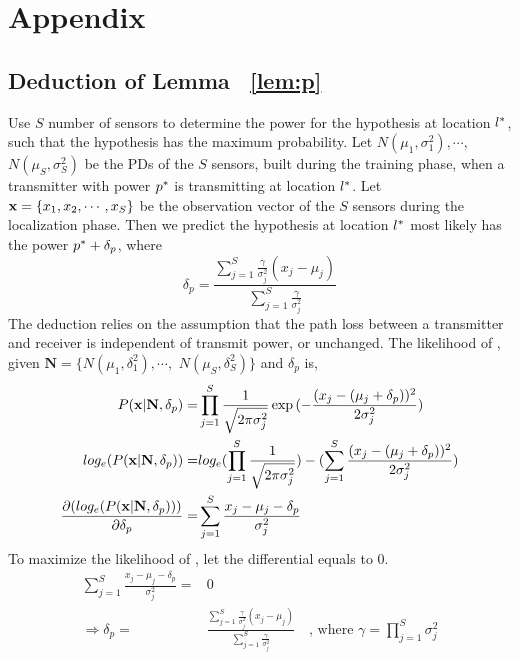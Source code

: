 \section*{Appendix}
\subsection*{Deduction of Lemma ~\ref{lem:p}}
Use $S$ number of sensors to determine the power for the hypothesis at location $l^*$, such that the hypothesis has the maximum probability.
Let $N(\mu_1, \sigma_1^2), \cdots, $ $N(\mu_S, \sigma_S^2)$ be the PDs of the $S$ sensors, built during the training phase, when a transmitter with power $p^*$ is transmitting at location $l^*$. 
Let $\mathbf{x} = \{x_1, x_2, \cdots, x_S\}$ be the observation vector of the $S$ sensors during the localization phase. 
Then we predict the hypothesis at location $l^*$ most likely has the power $p^* + \delta_p$, where 
$$\delta_p = \frac{\sum_{j=1}^{S} \frac{\gamma}{\sigma_j^2} (x_j - \mu_j)}{\sum_{j=1}^{S} \frac{\gamma}{\sigma_j^2}}$$
The deduction relies on the assumption that the path loss between a transmitter and receiver is independent of transmit power, or unchanged. The likelihood of \vx, given  $ \mathbf{N} = \{ N(\mu_1, \delta_1^2), \cdots, $ $N(\mu_S, \delta_S^2) \} $ and $\delta_p$ is,
\begin{align*}
P(\mathbf{x} | \mathbf{N}, \delta_p)        = & \prod_{j=1}^{S} \frac{1}{\sqrt{2\pi\sigma_j^2}} \exp{(- \frac{(x_j - (\mu_j + \delta_p))^2}{2\sigma_j^2})} \\
log_e(P(\mathbf{x} | \mathbf{N}, \delta_p)) = & log_e(\prod_{j=1}^{S}\frac{1}{\sqrt{2\pi\sigma_j^2}}) - (\sum_{j=1}^{S} \frac{(x_j - (\mu_j + \delta_p))^2}{2\sigma_j^2})  \\
\frac{\partial (log_e(P(\mathbf{x} | \mathbf{N}, \delta_p))) }{\partial \delta_p} = & \sum_{j=1}^{S} \frac{x_j - \mu_j - \delta_p}{\sigma_j^2}
\end{align*}
To maximize the likelihood of \vx, let the differential equals to 0.
\begin{align*}
\sum_{j=1}^{S} \frac{x_j - \mu_j - \delta_p}{\sigma_j^2} = & 0 \\
\Rightarrow \delta_p= & \frac{\sum_{j=1}^{S} \frac{\gamma}{\sigma_j^2} (x_j - \mu_j)}{\sum_{j=1}^{S} \frac{\gamma}{\sigma_j^2}}  \ \ \ \text{ , where } \gamma = \prod_{j=1}^{S}\sigma_j^2 \\
\end{align*}
